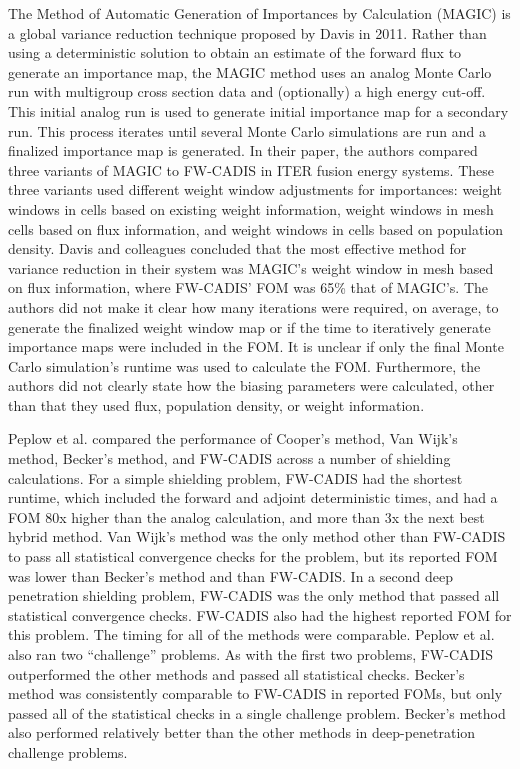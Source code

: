 The Method of Automatic Generation of Importances by Calculation (MAGIC) is a
global variance reduction technique \cite{davis_comparison_2011} proposed by
Davis in 2011.
Rather than using a deterministic solution to obtain an estimate of the forward
flux to generate an importance map, the MAGIC method uses an analog Monte Carlo
run with multigroup cross section data and (optionally) a high energy cut-off.
This initial analog run is used to generate initial importance map for a
secondary run.
This process iterates until several Monte Carlo simulations are run and a
finalized importance map is generated.
In their paper, the authors compared three variants of MAGIC to FW-CADIS in ITER
fusion energy systems.
These three variants used different weight window adjustments for importances:
weight windows in cells based on existing weight information, weight windows in
mesh cells based on flux information, and weight windows in cells based on
population density.
Davis and colleagues concluded that the most effective method for variance
reduction in their system was MAGIC's weight window in mesh based on flux
information, where FW-CADIS' FOM was 65\% that of MAGIC's.
The authors did not make it clear how many iterations were required, on average,
to generate the finalized weight window map or if the time to iteratively
generate importance maps were included in the FOM.
It is unclear if only the final Monte Carlo simulation's runtime was used to
calculate the FOM.
Furthermore, the authors did not clearly state how the biasing parameters were
calculated, other than that they used flux, population density, or weight
information.

Peplow et al. \cite{peplow_comparison_2012} compared the performance of
Cooper's method, Van Wijk's method, Becker's method, and FW-CADIS
across a number of shielding calculations. For a simple shielding
problem, FW-CADIS had the shortest runtime, which included the forward and
adjoint deterministic times, and had a FOM 80x higher than the analog
calculation, and more than 3x the next best hybrid method. Van Wijk's method was
the only method other than FW-CADIS to pass all statistical convergence checks
for the problem, but its reported FOM was lower than Becker's method and than
FW-CADIS. In a second deep penetration shielding problem, FW-CADIS was the
only method
that passed all statistical convergence checks. FW-CADIS also had the highest
reported FOM for this problem. The timing for all of the methods were
comparable. Peplow et al. also ran two ``challenge'' problems. As with the first
two problems, FW-CADIS outperformed the other methods and passed all statistical
checks. Becker's method was
consistently comparable to FW-CADIS in reported FOMs, but only passed all of the
statistical checks in a single challenge problem. Becker's method also performed
relatively better than the other methods in deep-penetration challenge problems.

